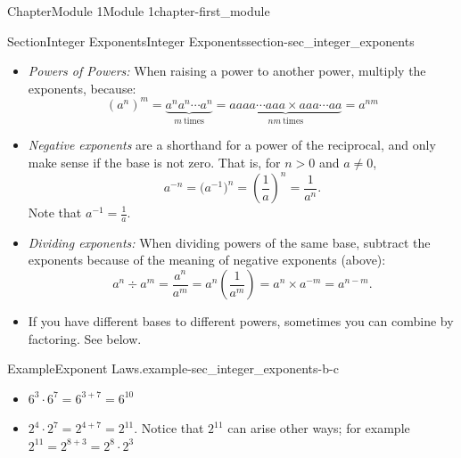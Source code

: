 \documentclass[oneside,10pt,]{book}
\begin{document}
\begin{chapterptx}{Chapter}{Module 1}{}{Module 1}{}{}{chapter-first_module}
\begin{sectionptx}{Section}{Integer Exponents}{}{Integer Exponents}{}{}{section-sec_integer_exponents}
\begin{introduction}{}
\begin{itemize}[label=\textbullet]
\begin{equation*}
a^n  \times a^m = \underbrace{aa\cdots a}_{n\ \mathrm{times}}  \times \underbrace{aa\cdots a}_{m\ \mathrm{times} } = \underbrace{aa\cdots a \times aa\cdots a}_{n+m\ \mathrm{times} } = a^{n+m}
\end{equation*}
When multiplying exponential expressions of different bases but of the same power, multiply by the bases together and raise it to the exponent, because:%
\begin{equation*}
a^n\times b^n = \underbrace{aa\cdots a}_{n\ \mathrm{times}}  \times \underbrace{bb\cdots b}_{n\ \mathrm{times} } = \underbrace{abab \cdots ab}_{n\ \mathrm{times} } = (ab)^n
\end{equation*}
%
\item{} \emph{Powers of Powers:} When raising a power to another power, multiply the exponents, because:%
\begin{equation*}
(a^n)^m  =  \underbrace{a^n a^n\cdots a^n}_{m\ \mathrm{times}}= \underbrace{aaaa\cdots aaa \times aaa\cdots aa}_{nm\ \mathrm{times} } =  a^{nm}
\end{equation*}
%
\item{} \emph{Negative exponents} are a shorthand for a power of the reciprocal, and only make sense if the base is not zero.  That is, for \(n > 0\) and \(a \neq 0\),%
\begin{equation*}
a^{-n} =  \big( a^{-1} \big)^n = \left( \frac{1}{a} \right)^n= \frac{1}{a^n}\text{.}
\end{equation*}
Note that  \(a^{-1} = \frac{1}{a}\).%
\item{} \emph{Dividing exponents:} When dividing powers of the same base, subtract the exponents because of the meaning of negative exponents (above):%
\begin{equation*}
a^n \div a^m = \frac{a^n}{a^m}= a^n\left(\frac{1}{a^m}\right)= a^n \times a^{-m} =  a^{n-m}\text{.}
\end{equation*}
%
\item{}If you have different bases to different powers, sometimes you can combine by factoring.  See below.%
\end{itemize}
\begin{example}{Example}{Exponent Laws.}{example-sec_integer_exponents-b-c}%
%
\begin{itemize}[label=\textbullet]
\item{}\(\displaystyle 6^3 \cdot 6^7 = 6^{3+7} = 6^{10}\)%
\item{}\(2^4 \cdot 2^7 = 2^{4+7} = 2^{11}\).  Notice that \(2^{11}\) can arise other ways; for example \(2^{11} =2^{8+3} = 2^8 \cdot 2^3\)%

\end{itemize}
\end{example}
\end{introduction}
\end{sectionptx}
\end{chapterptx}
\end{document}
